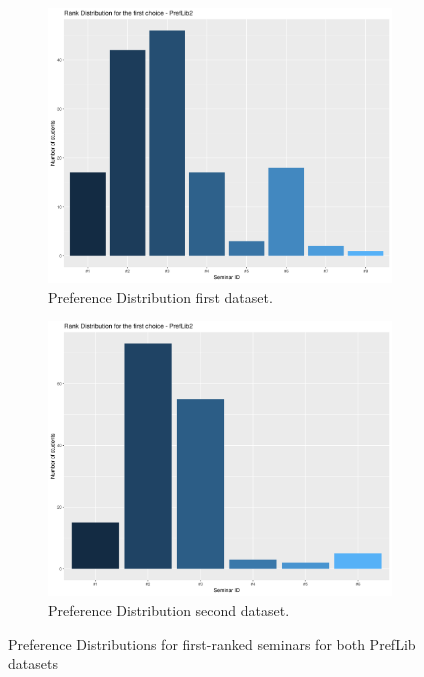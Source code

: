\begin{figure}[h!]
    \centering
    \begin{subfigure}[b]{0.49\linewidth}
      \includegraphics[width=\linewidth]{assets/plots/preflib1-distribution.png}
      \caption{Preference Distribution first dataset.}
    \end{subfigure}
    \begin{subfigure}[b]{0.49\linewidth}
      \includegraphics[width=\linewidth]{assets/plots/preflib2-distribution.png}
      \caption{Preference Distribution second dataset.}
    \end{subfigure}
    \caption{Preference Distributions for first-ranked seminars for both PrefLib datasets}
    \label{fig:preflib-distribution}
  \end{figure}

